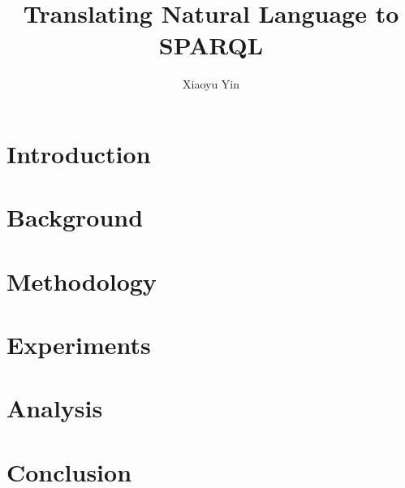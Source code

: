 \documentclass[hyperref, lof, lot, noproblem, masterofscience]{cgvpub}
\author{Xiaoyu Yin}
\title{Translating Natural Language to SPARQL}
\begin{document}
\chapter{Introduction} \label{chapter:introduction}




\chapter{Background} \label{chapter:background}





\chapter{Methodology} \label{chapter:methodology}




\chapter{Experiments} \label{chapter:experiments}




\chapter{Analysis} \label{chapter:analysis}




\chapter{Conclusion} \label{chapter:conclusion}


\end{document}
